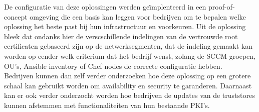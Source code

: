 De configuratie van deze oplossingen werden geïmplenteerd in een proof-of-concept omgeving die een basis kan leggen voor bedrijven om te bepalen welke oplossing het beste past bij hun infrastructuur en voorkeuren.
Uit de oplossing bleek dat ondanks hier de verscschillende indelingen van de vertrouwde root certificaten gebaseerd zijn op de netwerksegmenten, dat de indeling gemaakt kan worden op eender welk criterium dat het bedrijf wenst, zolang de SCCM groepen, OU's, Ansible inventory of Chef nodes de correcte configuratie hebben. \\

Bedrijven kunnen dan zelf verder onderzoeken hoe deze oplossing op een grotere schaal kan gebruikt worden om availability en security te garanderen. Daarnaast kan er ook verder onderzocht worden hoe bedrijven de updates van de truststores kunnen afstemmen met functionaliteiten van hun bestaande PKI's.